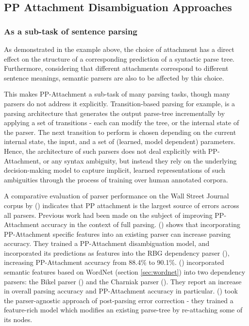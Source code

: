 \subsection{PP Attachment Disambiguation Approaches}

\subsubsection{As a sub-task of sentence parsing}
As demonstrated in the example above, the choice of attachment has a direct effect on the structure of a corresponding prediction of a syntactic parse tree. Furthermore, considering that different attachments correspond to different sentence meanings, semantic parsers are also to be affected by this choice. 

This makes PP-Attachment a sub-task of many parsing tasks, though many parsers do not address it explicitly. Transition-based parsing for example, is a parsing architecture that generates the output parse-tree incrementally by applying a set of transitions - each can modify the tree, or the internal state of the parser. The next transition to perform is chosen depending on the current internal state, the input, and a set of (learned, model dependent) parameters. Hence, the architecture of such parsers does not deal explicitly with PP-Attachment, or any syntax ambiguity, but instead they rely on the underlying decision-making model to capture implicit, learned representations of such ambiguities through the process of training over human annotated corpora. 


A comparative evaluation of parser performance on the Wall Street Journal corpus by (\cite{kummerfeld12parser}) indicates that PP attachment is the largest source of errors across all parsers.  Previous work had been made on the subject of improving PP-Attachment accuracy in the context of full parsing. (\cite{hpcd}) shows that incorporating PP-Attachment specific features into an existing parser can increase parsing accuracy. They trained a PP-Attachment disambiguation model, and incorporated its predictions as features into the RBG dependency parser (\cite{lei-etal-14-low}), increasing PP-Attachment accuracy from 88.4\% to 90.1\%.  (\cite{agirre-etal-08-improving}) incorporated semantic features based on WordNet (section \ref{sec:wordnet}) into two dependency parsers: the Bikel parser (\cite{bikel}) and the Charniak parser (\cite{charniak}). They report an increase in overall parsing accuracy and PP-Attachment accuracy in particular. (\cite{henestrozaanguiano:hal-00602083}) took the parser-agnostic approach of post-parsing error correction - they trained a feature-rich model which modifies an existing parse-tree by re-attaching some of its nodes. 

